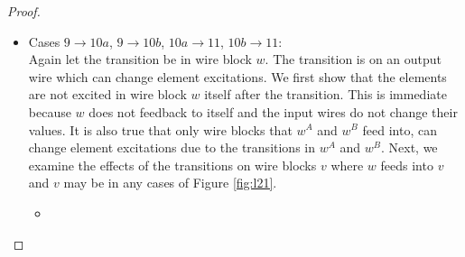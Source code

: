 \documentclass[12pt]{report}
\begin{document}
\begin{proof}
\begin{itemize}
\item
Cases $9\rightarrow10a$, $9\rightarrow10b$, $10a\rightarrow11$, $10b\rightarrow11$:  \\
Again let the transition be in wire block $w$.  The transition is on an output wire which can change element excitations.  We first show that the elements are not excited in wire block $w$ itself after the transition.  This is immediate because $w$ does not feedback to itself and the input wires do not change their values.  It is also true that only wire blocks that $w^A$ and $w^B$ feed into, can change element excitations due to the transitions in $w^A$ and $w^B$.  
Next, we examine the effects of the transitions on wire blocks $v$ where $w$ feeds into $v$ and $v$ may be in any cases of Figure \ref{fig:l21}.  
\begin{itemize}
\item

\end{itemize}
\end{itemize}
\end{proof}
\end{document}
